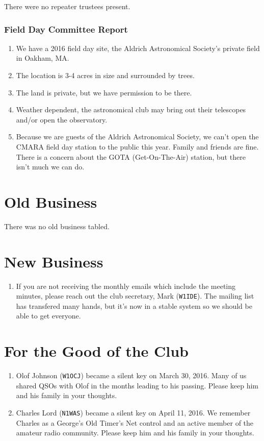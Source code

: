 \documentclass[10pt,letterpaper]{article}
\begin{document}
There were no repeater trustees present.

\subsubsection{Field Day Committee Report}

\begin{enumerate}
\item We have a 2016 field day site, the Aldrich Astronomical Society's private field in Oakham, MA.
\item The location is 3-4 acres in size and surrounded by trees.
\item The land is private, but we have permission to be there.
\item Weather dependent, the astronomical club may bring out their telescopes and/or open the observatory.
\item Because we are guests of the Aldrich Astronomical Society, we can't open the CMARA field day station to the public this year. Family and friends are fine. There is a concern about the GOTA (Get-On-The-Air) station, but there isn't much we can do.
\end{enumerate}

\section{Old Business}

There was no old business tabled.

\section{New Business}

\begin{enumerate}
\item If you are not receiving the monthly emails which include the meeting minutes, please reach out the club secretary, Mark (\texttt{W1IDE}). The mailing list has transfered many hands, but it's now in a stable system so we should be able to get everyone.
\end{enumerate}

\section{For the Good of the Club}

\begin{enumerate}
\item Olof Johnson (\texttt{W1OCJ}) became a silent key on March 30, 2016. Many of us shared QSOs with Olof in the months leading to his passing. Please keep him and his family in your thoughts.
\item Charles Lord (\texttt{N1WAS}) became a silent key on April 11, 2016. We remember Charles as a George's Old Timer's Net control and an active member of the amateur radio community. Please keep him and his family in your thoughts.
\end{enumerate}
\end{document}
